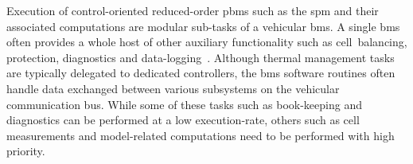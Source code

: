 Execution of  control-oriented reduced-order  \glspl{pbm} such as  the \gls{spm}
and  their  associated  computations  are   modular  sub-tasks  of  a  vehicular
\gls{bms}.  A   single  \gls{bms}   often  provides  a   whole  host   of  other
auxiliary  functionality such  as  cell~balancing,  protection, diagnostics  and
data-logging~\cite{Plett2016}. Although  thermal management tasks  are typically
delegated to dedicated controllers, the \gls{bms} software routines often handle
data exchanged  between various subsystems  on the vehicular  communication bus.
While some of these tasks such  as book-keeping and diagnostics can be performed
at  a low  execution-rate, others  such as  cell measurements  and model-related
computations need to be performed with high priority.

\begin{figure}[!tbp]
\end{figure}
